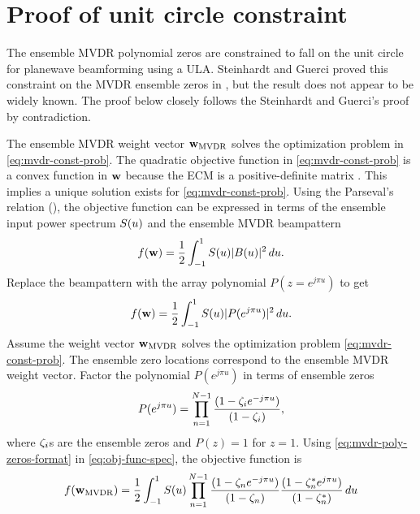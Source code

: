 \chapter{Proof of unit circle constraint}%
\label{sec:apdx-mvdr-zeros}

The ensemble MVDR polynomial zeros are constrained to fall on the unit circle
for planewave beamforming using a ULA. Steinhardt and Guerci proved this
constraint on the MVDR ensemble zeros in \cite{steinhardt2004stap},
but the result does not appear to be widely known. The proof below
closely follows the Steinhardt and Guerci's proof by contradiction.

The ensemble MVDR weight vector ${\bf w}_{\rm MVDR}$ solves the optimization problem in
\eqref{eq:mvdr-const-prob}. The quadratic objective function in
\eqref{eq:mvdr-const-prob} is a convex function in ${\bf w}$ because the
ECM is a positive-definite matrix \cite{vtree2002oap}. This implies a
unique solution exists for \eqref{eq:mvdr-const-prob}. Using the Parseval's relation (\cite[Sec.~5.4.1.3]{vtree2002oap}), the objective
function can be expressed in terms of the ensemble input power spectrum
$S(u)$ and the ensemble MVDR beampattern
\begin{equation}
\label{eq:obj-func-spec}
f({\bf w}) = \frac{1}{2}\int_{-1}^{1}S(u) |B(u)|^2 \,du.
\end{equation}
Replace the beampattern with the array polynomial
${P(z = e^{j\pi u})}$ to get
\begin{equation}
\label{eq:obj-func-poly}
f({\bf w}) = \frac{1}{2}\int_{-1}^{1}S(u) |P(e^{j\pi u})|^2 \,du.
\end{equation}
Assume the weight vector ${\bf w}_{\rm MVDR}$ solves the optimization problem \eqref{eq:mvdr-const-prob}. The ensemble zero locations correspond to the ensemble MVDR weight vector. Factor the polynomial $P(e^{j\pi u})$ in terms of ensemble zeros
\begin{equation}
  \label{eq:mvdr-poly-zeros-format}
P(e^{j\pi u}) = \prod\limits_{n=1}^{N-1}\frac{(1 - \zeta_i e^{-j\pi u})}{(1 - \zeta_i)},
\end{equation}
where $\zeta_i$s are the ensemble zeros and $P(z) = 1$ for
$z = 1$.
Using \eqref{eq:mvdr-poly-zeros-format} in \eqref{eq:obj-func-spec},
the objective function is
\begin{equation}
\label{eq:obj-func-zeros-form}
f({\bf w}_{\rm MVDR}) = \frac{1}{2}\int_{-1}^{1}S(u) \prod\limits_{n=1}^{N-1}\frac{(1 -
   \zeta_n e^{-j\pi u})}{(1 - \zeta_n)} \frac{(1 - \zeta_n^*e^{j\pi u})}{(1 - \zeta_n^*)}\,du
\end{equation}
